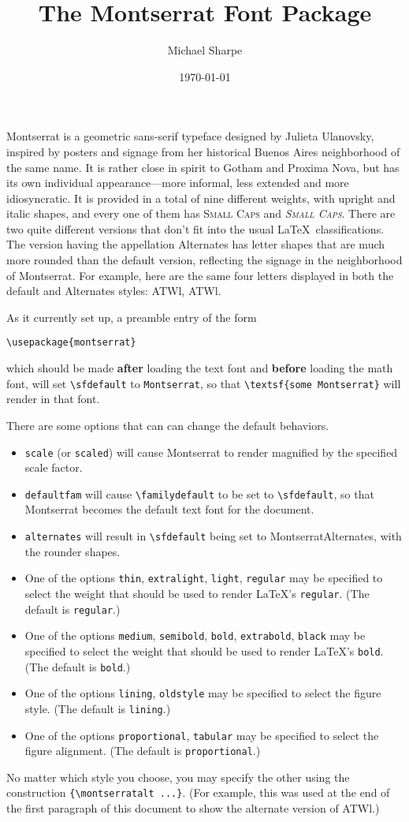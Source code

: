 \documentclass[11pt]{article}
\title{The Montserrat Font Package}
\author{Michael Sharpe}
\date{\today}  %
\begin{document}
\maketitle
Montserrat is a geometric sans-serif typeface designed by  Julieta Ulanovsky, inspired by posters and signage from her historical Buenos Aires neighborhood of the same name. It is rather close in spirit to Gotham and Proxima Nova, but has its own individual appearance---more informal, less extended and more idiosyncratic. It is provided in a total of nine different weights, with upright and italic shapes, and every one of them has \textsc{Small Caps} and \textit{\textsc{Small Caps}}. There are two quite different versions that don't fit into the usual \LaTeX\ classifications. The version having the appellation Alternates has letter shapes that are much more rounded than the default version, reflecting the signage in the neighborhood of Montserrat. For example, here are the same four letters displayed in both the default and  Alternates styles: ATWl, {\montserratalt ATWl}.

As it currently set up, a preamble entry of the form
\begin{verbatim}
\usepackage{montserrat}
\end{verbatim}
which should be made \textbf{after} loading the text font and \textbf{before} loading the math font, will set \verb|\sfdefault| to \verb|Montserrat|, so that \verb|\textsf{some Montserrat}| will render in that font. 

There are some options that can can change the default behaviors.
\begin{itemize}
\item {\tt scale} (or {\tt scaled}) will cause Montserrat to render magnified by the specified scale factor.
\item
{\tt defaultfam} will cause \verb|\familydefault| to be set to \verb|\sfdefault|, so that Montserrat becomes the default text font for the document.
\item {\tt alternates} will result in \verb|\sfdefault| being set to MontserratAlternates, with the rounder shapes.
\item One of the options {\tt thin}, {\tt extralight}, {\tt light}, {\tt regular} may be specified to select the weight that should be used to render \LaTeX's {\tt regular}. (The default is {\tt regular}.)
\item One of the options {\tt medium}, {\tt semibold}, {\tt bold}, {\tt extrabold}, {\tt black} may be specified to select the weight that should be used to render \LaTeX's {\tt bold}. (The default is {\tt bold}.)
\item One of the options {\tt lining}, {\tt oldstyle} may be specified to select the figure style. (The default is {\tt lining}.)
\item One of the options {\tt proportional}, {\tt tabular} may be specified to select the figure alignment. (The default is {\tt proportional}.)
\end{itemize}
No matter which style you choose, you may specify the other using the construction \verb|{\montserratalt ...}|. (For example, this was used at the end of the first paragraph of this document to show the alternate version of ATWl.)
\end{document}
